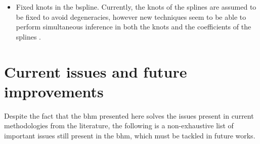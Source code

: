 \begin{itemize}
\item Fixed knots in the \gls{bspline}. Currently, the knots of the splines are assumed to be fixed to avoid degeneracies, however new techniques seem to be able to perform simultaneous inference in both the knots and the coefficients of the splines \citep{2017arXiv170704878E}.

\end{itemize}


\section{Current issues and future improvements}

Despite the fact that the \gls{bhm} presented here solves the issues present in current methodologies from the literature, the following is a non-exhaustive list of important issues still present in the \gls{bhm}, which must be tackled in  future works.



